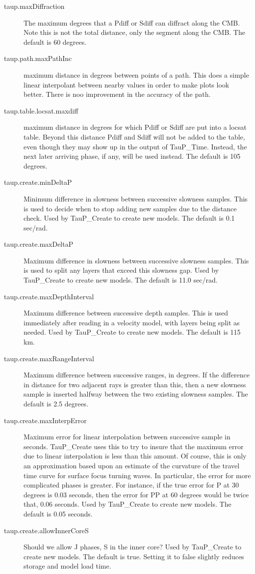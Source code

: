 \begin{description}
\item[taup.maxDiffraction] The maximum degrees that a Pdiff or Sdiff can diffract along the CMB.
 Note this is not the total distance, only the segment along the CMB. The default is 60 degrees.
\item[taup.path.maxPathInc] maximum distance in degrees between points of a path. This does a simple linear interpolant between nearby values in order to make plots look better. There is noo improvement in the accuracy of the path.
\item[taup.table.locsat.maxdiff] maximum distance in degrees for which Pdiff 
or Sdiff are put into a locsat table. Beyond this distance Pdiff and Sdiff will 
not be added to the table, even though they may show up in the output of 
TauP\_Time. Instead, the next later arriving phase, if any, will be used 
instead. The default is 105 degrees.
\item[taup.create.minDeltaP] Minimum difference in slowness between 
successive slowness samples. This is used to decide when to stop adding new 
samples due to the distance check.
Used by TauP\_Create to create new models. 
The default is 0.1 sec/rad. 
\item[taup.create.maxDeltaP] Maximum difference in slowness between 
successive slowness samples. This is used to split any layers that exceed
this slowness gap.
Used by TauP\_Create to create new models. 
 The default is 11.0 sec/rad. 
\item[taup.create.maxDepthInterval] Maximum difference between successive depth 
samples. This is used immediately after reading in a velocity model, with
layers being split as needed.
Used by TauP\_Create to create new models. 
 The default is 115 km. 
\item[taup.create.maxRangeInterval] Maximum difference between successive 
ranges, in degrees. If the difference in distance for two adjacent rays
is greater than this, then a new slowness sample is inserted halfway between
the two existing slowness samples.
The default is 2.5 degrees.
\item[taup.create.maxInterpError] Maximum error for linear interpolation
 between successive sample in seconds. TauP\_Create uses this to try to insure
that the maximum error due to linear interpolation is less than this amount.
Of course, this is only an approximation based upon an estimate of the
 curvature of the travel time curve for surface focus turning waves. 
In particular, the error for more complicated phases is greater. For instance,
if the true error for P at 30 degrees is 0.03 seconds, then the error for
PP at 60 degrees would be twice that, 0.06 seconds.
Used by TauP\_Create to create new models. The default is 0.05 seconds.
\item[taup.create.allowInnerCoreS] Should we allow J phases, S in 
the inner core?
Used by TauP\_Create to create new models. 
 The default is true. Setting it to false slightly reduces storage and model 
load time.
\end{description}

